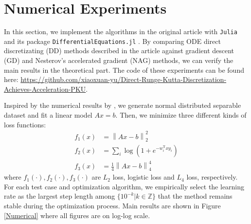 \section{Numerical Experiments}
In this section, we implement the algorithms in the original article with \texttt{Julia} and its package \texttt{DifferentialEquations.jl} \cite{rackauckas2017differentialequations}. By comparing ODE direct discretizating (DD) methods described in the article against gradient descent (GD) and Nesterov's accelerated gradient (NAG) methods, we can verify the main results in the theoretical part. The code of these experiments can be found here: \url{https://github.com/xiaoxuan-yu/Direct-Runge-Kutta-Discretization-Achieves-Acceleration-PKU}.

Inspired by the numerical results by \textcite{NEURIPS2019_7a2b33c6}, we generate normal distributed separable dataset and fit a linear model \(Ax=b\). Then, we minimize three different kinds of loss functions:
\begin{equation}
    \begin{aligned}
        f_1(x) & = \left\| Ax-b \right\|_{2}^2                \\
        f_2(x) & = \sum_{i}\log(1+e^{-w_i^{\mathrm{T}}x y_i}) \\
        f_3(x) & = \frac{1}{4}\left\| Ax-b \right\|_{4}^4
    \end{aligned}
\end{equation}
where $f_1(\cdot ),f_2(\cdot ),f_3(\cdot )$ are $L_2$ loss, logistic loss and $L_4$ loss, respectively. For each test case and optimization algorithm, we empirically select the learning rate as the largest step length among $\{ 10^{-k}|k\in \mathbb{Z} \}$ that the method remains stable during the optimization process. Main results are shown in Figure \ref{Numerical} where all figures are on log-log scale.
